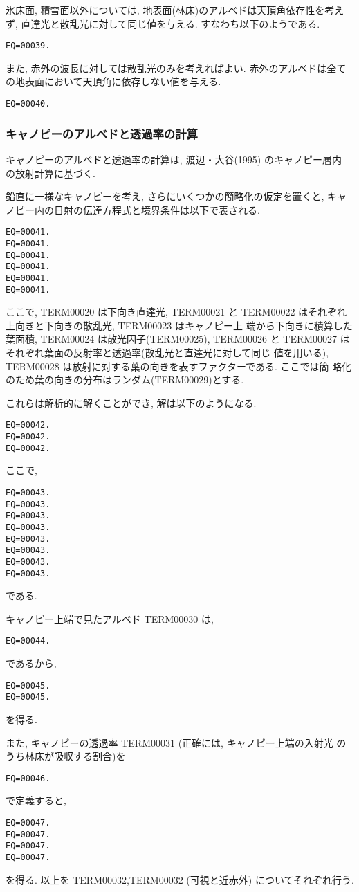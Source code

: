 氷床面, 積雪面以外については, 地表面(林床)のアルベドは天頂角依存性を考え
ず, 直達光と散乱光に対して同じ値を与える. すなわち以下のようである.
\begin{verbatim}
EQ=00039.
\end{verbatim}
また, 赤外の波長に対しては散乱光のみを考えればよい. 赤外のアルベドは全て
の地表面において天頂角に依存しない値を与える.
\begin{verbatim}
EQ=00040.
\end{verbatim}

\subsubsection{キャノピーのアルベドと透過率の計算}

キャノピーのアルベドと透過率の計算は, 渡辺・大谷(1995) のキャノピー層内
の放射計算に基づく.

鉛直に一様なキャノピーを考え, さらにいくつかの簡略化の仮定を置くと, キャ
ノピー内の日射の伝達方程式と境界条件は以下で表される.
\begin{verbatim}
EQ=00041.
EQ=00041.
EQ=00041.
EQ=00041.
EQ=00041.
EQ=00041.
\end{verbatim}
ここで, TERM00020 は下向き直達光, TERM00021 と
TERM00022 はそれぞれ上向きと下向きの散乱光, TERM00023 はキャノピー上
端から下向きに積算した葉面積, TERM00024 は散光因子(TERM00025),
TERM00026 と TERM00027 はそれぞれ葉面の反射率と透過率(散乱光と直達光に対して同じ
値を用いる), TERM00028 は放射に対する葉の向きを表すファクターである. ここでは簡
略化のため葉の向きの分布はランダム(TERM00029)とする.

これらは解析的に解くことができ, 解は以下のようになる.
\begin{verbatim}
EQ=00042.
EQ=00042.
EQ=00042.
\end{verbatim}
ここで,
\begin{verbatim}
EQ=00043.
EQ=00043.
EQ=00043.
EQ=00043.
EQ=00043.
EQ=00043.
EQ=00043.
EQ=00043.
\end{verbatim}
である.

キャノピー上端で見たアルベド TERM00030 は,
\begin{verbatim}
EQ=00044.
\end{verbatim}
であるから,
\begin{verbatim}
EQ=00045.
EQ=00045.
\end{verbatim}
を得る.

また, キャノピーの透過率 TERM00031 (正確には, キャノピー上端の入射光
のうち林床が吸収する割合)を
\begin{verbatim}
EQ=00046.
\end{verbatim}
で定義すると,
\begin{verbatim}
EQ=00047.
EQ=00047.
EQ=00047.
EQ=00047.
\end{verbatim}
を得る.
以上を TERM00032,TERM00032 (可視と近赤外) についてそれぞれ行う.

